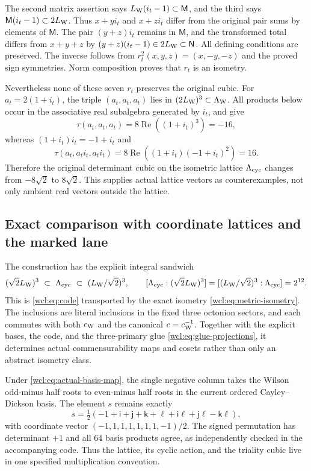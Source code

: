 The second matrix assertion says
$L_{\rm W}(i_t-1)\subset\mathsf M$, and the third says
$\mathsf M(i_t-1)\subset2L_{\rm W}$. Thus $x+yi_t$ and $x+zi_t$
differ from the original pair sums by elements of $\mathsf M$.
The pair $(y+z)i_t$ remains in $\mathsf M$, and the transformed total
differs from $x+y+z$ by
$(y+z)(i_t-1)\in2L_{\rm W}\subset\mathsf N$.
All defining conditions are preserved. The inverse follows from
$r_t^2(x,y,z)=(x,-y,-z)$ and the proved sign symmetries.
Norm composition proves that $r_t$ is an isometry.

Nevertheless none of these seven $r_t$ preserves the original cubic.
For $a_t=2(1+i_t)$, the triple $(a_t,a_t,a_t)$ lies in
$(2L_{\rm W})^3\subset\Lambda_{\rm W}$. All products below occur in
the associative real subalgebra generated by $i_t$, and give
\[
 \tau(a_t,a_t,a_t)=8\operatorname{Re}((1+i_t)^3)=-16,
\]
whereas $(1+i_t)i_t=-1+i_t$ and
\[
 \tau(a_t,a_ti_t,a_ti_t)
 =8\operatorname{Re}((1+i_t)(-1+i_t)^2)=16.
\]
Therefore the original determinant cubic on the isometric lattice
$\Lambda_{\rm cyc}$ changes from $-8\sqrt2$ to $8\sqrt2$.
This supplies actual lattice vectors as counterexamples, not only
ambient real vectors outside the lattice.

\subsection{Exact comparison with coordinate lattices and the marked lane}

The construction has the explicit integral sandwich
\begin{equation}
 (\sqrt2L_{\rm W})^3
 \ \subset\ \Lambda_{\rm cyc}\
 \subset\ (L_{\rm W}/\sqrt2)^3,
 \qquad
 [\Lambda_{\rm cyc}:(\sqrt2L_{\rm W})^3]
 =[(L_{\rm W}/\sqrt2)^3:\Lambda_{\rm cyc}]=2^{12}.
 \label{wcl:eq:coordinate-sandwich}
\end{equation}
This is \eqref{wcl:eq:code} transported by the exact isometry
\eqref{wcl:eq:metric-isometry}. The inclusions are literal inclusions
in the fixed three octonion sectors, and each commutes with both
$c_{\rm W}$ and the canonical $c=c_{\rm W}^{-1}$.
Together with the explicit bases, the code, and the three-primary
glue \eqref{wcl:eq:glue-projections}, it determines actual
commensurability maps and cosets rather than only an abstract
isometry class.

Under \eqref{wcl:eq:actual-basis-map}, the single negative column
takes the Wilson odd-minus half roots to even-minus half roots in
the current ordered Cayley--Dickson basis. The element $s$ remains
exactly
\[
 s=\tfrac12(-1+\mathsf i+\mathsf j+\mathsf k+\ell
                     +\mathsf i\ell+\mathsf j\ell-\mathsf k\ell),
\]
with coordinate vector $(-1,1,1,1,1,1,1,-1)/2$.
The signed permutation has determinant $+1$ and all $64$ basis
products agree, as independently checked in the accompanying code.
Thus the lattice, its cyclic action, and the triality cubic live
in one specified multiplication convention.


